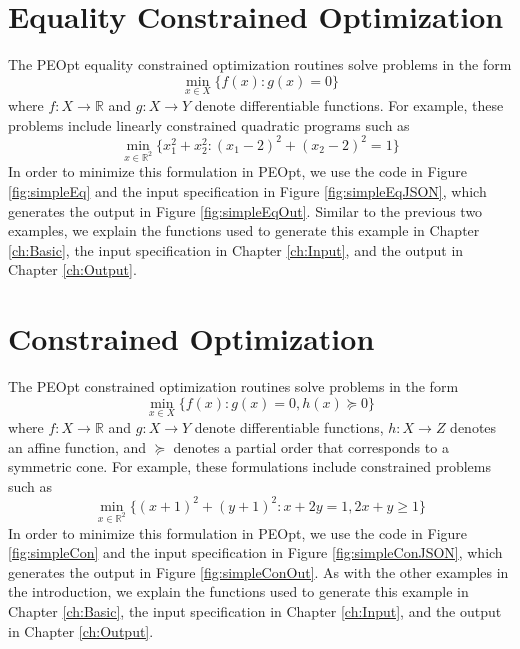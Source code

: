 \documentclass{report}
\newcommand{\re}{\mathbb{R}}
\begin{document}




\section{Equality Constrained Optimization}\setcounter{figure}{2}

        The PEOpt equality constrained optimization routines solve problems in the form
$$
        \min_{x\in X} \{ f(x) : g(x)=0 \}
$$
where $f:X\rightarrow \re$ and $g:X\rightarrow Y$ denote differentiable functions.  For example, these problems include linearly constrained quadratic programs such as
$$
        \min_{x\in\re^2}\{x_1^2+x_2^2 : (x_1-2)^2 + (x_2-2)^2 = 1 \}
$$
In order to minimize this formulation in PEOpt, we use the code in Figure \ref{fig:simpleEq} and the input specification in Figure \ref{fig:simpleEqJSON}, which generates the output in Figure \ref{fig:simpleEqOut}.  Similar to the previous two examples, we explain the functions used to generate this example in Chapter \ref{ch:Basic}, the input specification in Chapter \ref{ch:Input}, and the output in Chapter \ref{ch:Output}.





\section{Constrained Optimization}\setcounter{figure}{3}

        The PEOpt constrained optimization routines solve problems in the form
$$
        \min_{x\in X} \{ f(x) : g(x)=0, h(x)\succeq 0 \}
$$
where $f:X\rightarrow \re$ and $g:X\rightarrow Y$ denote differentiable functions, $h:X\rightarrow Z$ denotes an affine function, and $\succeq$ denotes a partial order that corresponds to a symmetric cone.  For example, these formulations include constrained problems such as 
$$
        \min_{x\in\re^2}\{(x+1)^2+(y+1)^2 :  x + 2y = 1, 2x + y \geq 1 \} 
$$
In order to minimize this formulation in PEOpt, we use the code in Figure \ref{fig:simpleCon} and the input specification in Figure \ref{fig:simpleConJSON}, which generates the output in Figure \ref{fig:simpleConOut}.  As with the other examples in the introduction, we explain the functions used to generate this example in Chapter \ref{ch:Basic}, the input specification in Chapter \ref{ch:Input}, and the output in Chapter \ref{ch:Output}.
\end{document}
